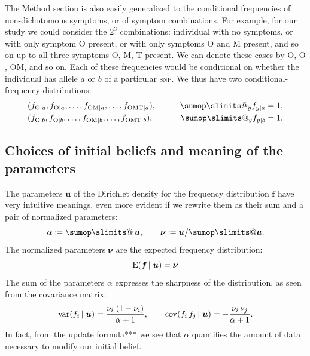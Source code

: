 \documentclass[\ifafour a4paper,12pt,\else a5paper,10pt,\fi%
onecolumn,oneside,article,%
british%
]{memoir}
\makeatletter
\theoremstyle{remark}
\theoremstyle{innote}
\def\sum{\DOTSI\sumop\slimits@}
\newcommand*{\defd}{\coloneqq}
\newcommand*{\E}{\mathrm{E}}
\renewcommand*{\|}[1][]{\nonscript\,#1\vert\nonscript\;\mathopen{}}
\newcommand*{\tsum}{\mathop{\textstyle\sum}\nolimits}
\DeclareMathOperator{\cov}{cov}
\DeclareMathOperator{\var}{var}
\newcommand*{\snp}{\textsc{snp}}
\newcommand*{\ya}{a}
\newcommand*{\yb}{b}
\newcommand*{\ysO}{\textrm{O}}%
\newcommand*{\ysM}{\textrm{M}}%
\newcommand*{\ysT}{\textrm{T}}%
\newcommand*{\yA}{\alpha}
\newcommand*{\yqq}{\nu}
\newcommand*{\yq}{\bm{\yqq}}
\newcommand*{\yu}{\bm{u}}
\newcommand*{\yf}{\bm{f}}
\newcommand*{\ysum}{\tsum}
\makeatother
\begin{document}
The Method section is also easily generalized to the conditional
frequencies of non-dichotomous symptoms, or of symptom combinations. For
example, for our study we could consider the $2^3$ combinations: individual
with no symptoms, or with only symptom $\ysO$ present, or with only
symptoms $\ysO$ and $\ysM$ present, and so on up to all three symptoms
$\ysO$, $\ysM$, $\ysT$ present. We can denote these cases by $\ysO$,
$\ysO$, $\ysO\ysM$, and so on. Each of these frequencies would be
conditional on whether the individual has allele $\ya$ or $\yb$ of a
particular \snp. We thus have two conditional-frequency distributions:
\begin{equation}
  \label{eq:f_distr_symptom_combo}
  \begin{aligned}
    &(f_{\ysO\|\ya},f_{\ysO\|\ya},\dotsc,f_{\ysO\ysM\|\ya},\dotsc,f_{\ysO\ysM\ysT\|\ya}),
    \qquad&\sum_{y} f_{y\|\ya} =1,
      \\
    &(f_{\ysO\|\yb},f_{\ysO\|\yb},\dotsc,f_{\ysO\ysM\|\yb},\dotsc,f_{\ysO\ysM\ysT\|\yb}),
    \qquad&\sum_{y} f_{y\|\yb} =1.
  \end{aligned}
\end{equation}



\subsection{Choices of initial beliefs and meaning of the parameters}
\label{sec:choices_prior_info}


The parameters $\yu$ of the Dirichlet density for the frequency
distribution $\yf$ have very intuitive meanings, even more evident if we
rewrite them as their sum and a pair of normalized parameters:
\begin{equation}
  \label{eq:rewrite_params}
  \yA \defd \ysum\yu,
  \qquad
  \yq\defd\yu/\sum\yu.
\end{equation}
The normalized parameters $\yq$ are the expected frequency distribution:
\begin{equation}
  \label{eq:meaning_normalized_parameters}
  \E(\yf \| \yu) = \yq
\end{equation}
The sum of the parameters $\yA$ expresses the sharpness of the
distribution, as seen from the covariance matrix:
\begin{equation}
  \label{eq:variances_covariances}
  \var(f_i \| \yu) = \frac{\yqq_i\;(1-\yqq_i)}{\yA+1},
  \qquad
  \cov(f_i\,f_j \| \yu) = -\frac{\yqq_i\,\yqq_j}{\yA+1}.
\end{equation}
In fact, from the update formula*** we see that $\yA$ quantifies the amount
of data necessary to modify our initial belief.
\end{document}

